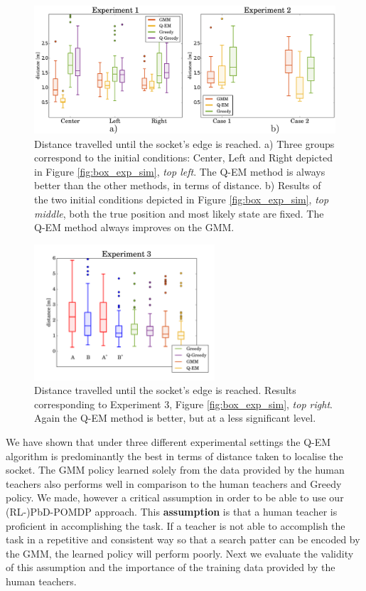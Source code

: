 \documentclass[final,3p,times,twocolumn]{elsarticle}
\begin{document}
\begin{figure}
 \centering
  \includegraphics[width=\textwidth]{./Figures/Fig/experiment_1_2.pdf}
  \caption{Distance travelled until the socket's edge is reached. a) Three groups correspond to the initial conditions: Center, Left and Right
   depicted in Figure \ref{fig:box_exp_sim}, \textit{top left}. The Q-EM method is always better than the other methods, in terms of distance. b)
   Results of the two initial conditions depicted in Figure \ref{fig:box_exp_sim}, \textit{top middle}, both the true position and most likely state are
   fixed. The Q-EM method always improves on the GMM. }
   \label{fig:three_searches}
\end{figure}
\begin{figure}
 \centering
  \includegraphics[width=0.6\textwidth]{./Figures/Fig/experiment3_plot2.pdf}
  \caption{Distance travelled until the socket's edge is reached. Results corresponding to Experiment 3, Figure \ref{fig:box_exp_sim}, \textit{top right}.
   Again the Q-EM method is better, but at a less significant level.}
   \label{fig:three_searches_exp3}
\end{figure}
 

We have shown that under three different experimental settings the Q-EM algorithm is predominantly the best in terms of distance taken 
to localise the socket. The GMM policy learned solely from the data provided by the human teachers also performs well in comparison to  
the human teachers and Greedy policy. We made, however a critical assumption in order to be able to use our (RL-)PbD-POMDP approach. 
This \textbf{assumption} is that a human teacher is proficient in accomplishing the task. If a teacher is not able to accomplish 
the task in a repetitive and consistent way so that a search patter can be encoded by the GMM, the learned policy will perform poorly.
Next we evaluate the validity of this assumption and the importance of the training data provided by the human teachers.
% 
\end{document}
